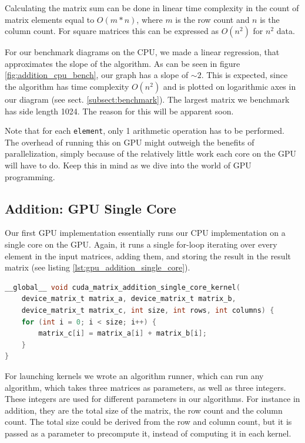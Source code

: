 Calculating the matrix sum can be done in linear time complexity in the count of matrix elements equal to $O(m * n)$, where $m$ is the row count and $n$ is the column count. For square matrices this can be expressed as $O(n^2)$ for $n^2$ data. 

 For our benchmark diagrams on the CPU, we made a linear regression, that approximates the slope of the algorithm. As can be seen in figure \ref{fig:addition_cpu_bench}, our graph has a slope of $\sim 2$. This is expected, since the algorithm has time complexity $O(n^2)$ and is plotted on logarithmic axes in our diagram (see sect. \ref{subsect:benchmark}). The largest matrix we benchmark has side length 1024. The reason for this will be apparent soon.

Note that for each \texttt{element}, only 1 arithmetic operation has to be performed. The overhead of running this on GPU might outweigh the benefits of parallelization, simply because of the relatively little work each core on the GPU will have to do. Keep this in mind as we dive into the world of GPU programming.

\subsection{Addition: GPU Single Core}
Our first GPU implementation essentially runs our CPU implementation on a single core on the GPU. Again, it runs a single for-loop iterating over every element in the input matrices, adding them, and storing the result in the result matrix (see listing \ref{lst:gpu_addition_single_core}).

\begin{lstlisting}[language=C, caption={GPU addition single core}, label={lst:gpu_addition_single_core}]
__global__ void cuda_matrix_addition_single_core_kernel(
    device_matrix_t matrix_a, device_matrix_t matrix_b,
    device_matrix_t matrix_c, int size, int rows, int columns) {
    for (int i = 0; i < size; i++) {
        matrix_c[i] = matrix_a[i] + matrix_b[i];
    }
}
\end{lstlisting}

For launching kernels we wrote an algorithm runner, which can run any algorithm, which takes three matrices as parameters, as well as three integers. These integers are used for different parameters in our algorithms. For instance in addition, they are the total size of the matrix, the row count and the column count. The total size could be derived from the row and column count, but it is passed as a parameter to precompute it, instead of computing it in each kernel. 

